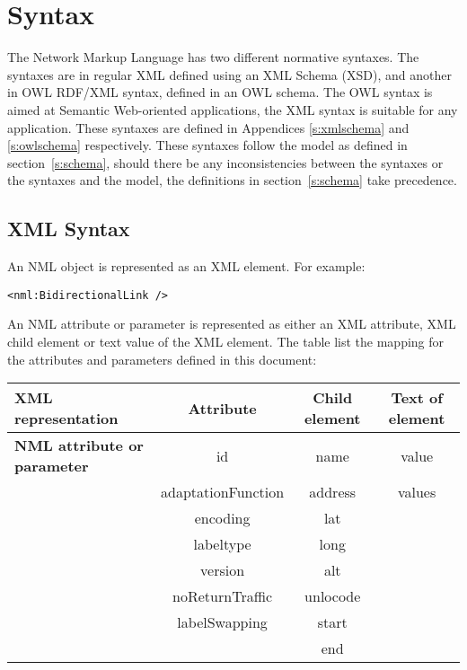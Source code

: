 
\section{Syntax}
\label{s:syntax}

The Network Markup Language has two different normative syntaxes. The syntaxes are in regular XML defined using an XML Schema (XSD), and another in OWL RDF/XML syntax, defined in an OWL schema.
The OWL syntax is aimed at Semantic Web-oriented applications, the XML syntax is suitable for any application. These syntaxes are defined in Appendices \ref{s:xmlschema} and \ref{s:owlschema} respectively. These syntaxes follow the model as defined in section~\ref{s:schema}, should there be any inconsistencies between the syntaxes or the syntaxes and the model, the definitions in section~\ref{s:schema} take precedence.


\subsection{XML Syntax} %
\label{sub:xml}

An NML object is represented as an XML element. For example:
\begin{lstlisting}
<nml:BidirectionalLink />
\end{lstlisting}

An NML attribute or parameter is represented as either an XML attribute, XML child element or text value of the XML element. The table list the mapping for the attributes and parameters defined in this document:

\begin{tabular}{|l|c|c|c|}
\hline
\textbf{XML representation} & \textbf{Attribute} & \textbf{Child element} & \textbf{Text of element} \\
\hline
\textbf{NML attribute or parameter} & id & name & value \\
 & adaptationFunction & address & values \\
 & encoding & lat & \\
 & labeltype & long & \\
 & version & alt & \\
 & noReturnTraffic & unlocode & \\
 & labelSwapping & start & \\
 &  & end & \\
\hline
\end{tabular}

